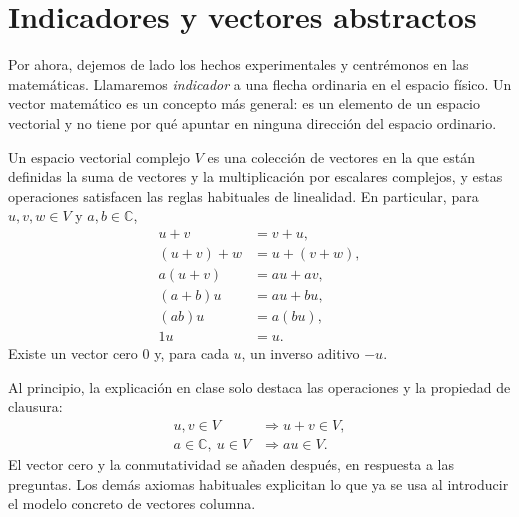 \begin{classroomqa}
\end{classroomqa}

\section{Indicadores y vectores abstractos}

Por ahora, dejemos de lado los hechos experimentales y centrémonos en las matemáticas. Llamaremos \emph{indicador} a una flecha ordinaria en el espacio físico. Un vector matemático es un concepto más general: es un elemento de un espacio vectorial y no tiene por qué apuntar en ninguna dirección del espacio ordinario.

\begin{definition}Un espacio vectorial complejo \(V\) es una colección de vectores en la que están definidas la suma de vectores y la multiplicación por escalares complejos, y estas operaciones satisfacen las reglas habituales de linealidad. En particular, para \(u,v,w\in V\) y \(a,b\in\mathbb C\),
\begin{align}
  u+v&=v+u,\\
  (u+v)+w&=u+(v+w),\\
  a(u+v)&=au+av,\\
  (a+b)u&=au+bu,\\
  (ab)u&=a(bu),\\
  1u&=u.
\end{align}
Existe un vector cero \(0\) y, para cada \(u\), un inverso aditivo \(-u\).
\end{definition}

Al principio, la explicación en clase solo destaca las operaciones y la propiedad de clausura:
\begin{equation}
\begin{aligned}
  u,v\in V&\Longrightarrow u+v\in V,\\
  a\in\mathbb C,\ u\in V&\Longrightarrow au\in V.
\end{aligned}
\end{equation}
El vector cero y la conmutatividad se añaden después, en respuesta a las preguntas. Los demás axiomas habituales explicitan lo que ya se usa al introducir el modelo concreto de vectores columna.

